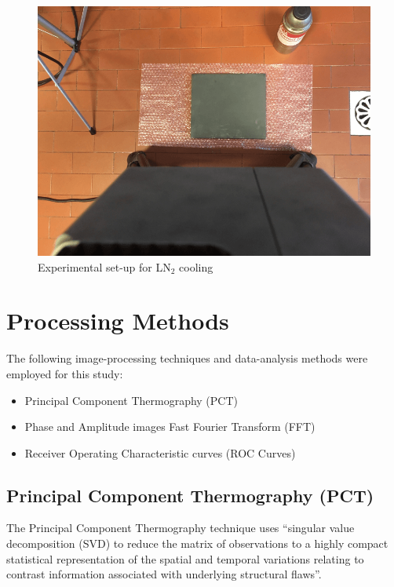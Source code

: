 \documentclass[]{spie}  %
\begin{document}
\begin{figure}[ht]
   \centering
   \includegraphics[scale=0.3]{graph/LN2_setup.png}
   \caption{Experimental set-up for LN$_2$ cooling}
   \label{Exp_LN2}
\end{figure}




\section{Processing Methods} %
\label{sec:processing_methods}
The following image-processing techniques and data-analysis methods were employed for this study:
\begin{itemize}
   \item Principal Component Thermography (PCT)
   \item Phase and Amplitude images Fast Fourier Transform (FFT)
   \item Receiver Operating Characteristic curves (ROC Curves)
\end{itemize}

\subsection{Principal Component Thermography (PCT)}
The Principal Component Thermography technique\cite{Rajic2002} uses “singular value decomposition (SVD) to reduce the matrix of observations to a highly compact statistical representation of the spatial and temporal variations relating to contrast information associated with underlying structural flaws”.
\end{document}
